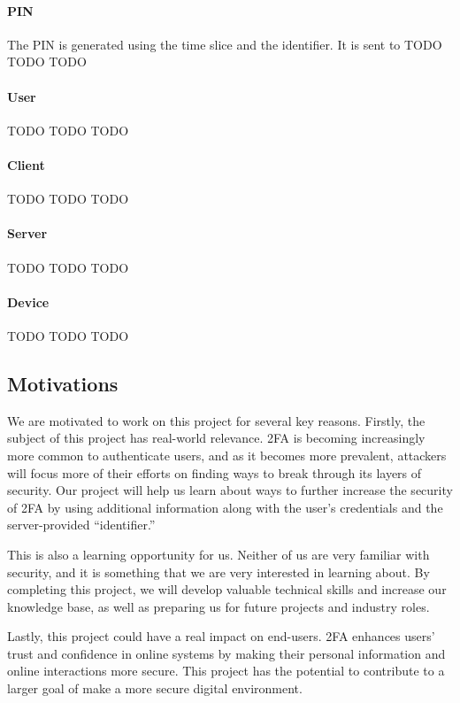 \documentclass[11pt]{article} %
\begin{document}
\paragraph{PIN} The PIN is generated using the time slice and the
identifier. It is sent to TODO TODO TODO

\paragraph{User} TODO TODO TODO

\paragraph{Client} TODO TODO TODO

\paragraph{Server} TODO TODO TODO

\paragraph{Device} TODO TODO TODO

\subsection{Motivations}

We are motivated to work on this project for several key reasons.
Firstly, the subject of this project has real-world relevance. 2FA is
becoming increasingly more common to authenticate users, and as it
becomes more prevalent, attackers will focus more of their efforts on
finding ways to break through its layers of security. Our project will
help us learn about ways to further increase the security of 2FA by
using additional information along with the user's credentials and the
server-provided ``identifier.''

This is also a learning opportunity for us. Neither of us are very
familiar with security, and it is something that we are very interested
in learning about. By completing this project, we will develop valuable
technical skills and increase our knowledge base, as well as preparing
us for future projects and industry roles.

Lastly, this project could have a real impact on end-users. 2FA enhances
users' trust and confidence in online systems by making their personal
information and online interactions more secure. This project has the
potential to contribute to a larger goal of make a more secure digital
environment. 
\end{document}
